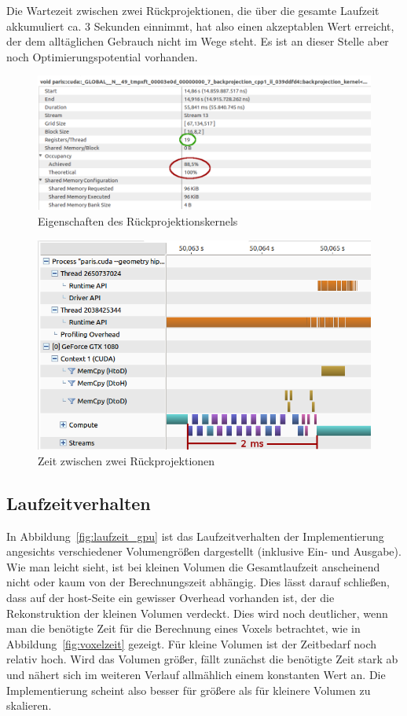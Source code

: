 Die Wartezeit zwischen zwei Rückprojektionen, die über die gesamte Laufzeit akkumuliert ca. 3 Sekunden einnimmt, hat
also einen akzeptablen Wert erreicht, der dem alltäglichen Gebrauch nicht im Wege steht. Es ist an dieser Stelle aber
noch Optimierungspotential vorhanden.

\begin{figure}
    \includegraphics[width=\linewidth]{img/kernel_properties}
    \caption{Eigenschaften des Rückprojektionskernels\label{fig:kernel_props}} 
\end{figure}

\begin{figure}
    \includegraphics[width=\linewidth]{img/timeline_compute3}
    \caption{Zeit zwischen zwei Rückprojektionen\label{fig:kernel_wait}} 
\end{figure}

\subsection{Laufzeitverhalten}

In Abbildung~\ref{fig:laufzeit_gpu} ist das Laufzeitverhalten der Implementierung angesichts verschiedener Volumengrößen
dargestellt (inklusive Ein- und Ausgabe). Wie man leicht sieht, ist bei kleinen Volumen die Gesamtlaufzeit anscheinend
nicht oder kaum von der Berechnungszeit abhängig. Dies lässt darauf schließen, dass auf der \gls{host}-Seite ein
gewisser Overhead vorhanden ist, der die Rekonstruktion der kleinen Volumen verdeckt. Dies wird noch deutlicher, wenn
man die benötigte Zeit für die Berechnung eines Voxels betrachtet, wie in Abbildung~\ref{fig:voxelzeit} gezeigt. Für
kleine Volumen ist der Zeitbedarf noch relativ hoch. Wird das Volumen größer, fällt zunächst die benötigte Zeit stark ab
und nähert sich im weiteren Verlauf allmählich einem konstanten Wert an. Die Implementierung scheint also besser für
größere als für kleinere Volumen zu skalieren.

